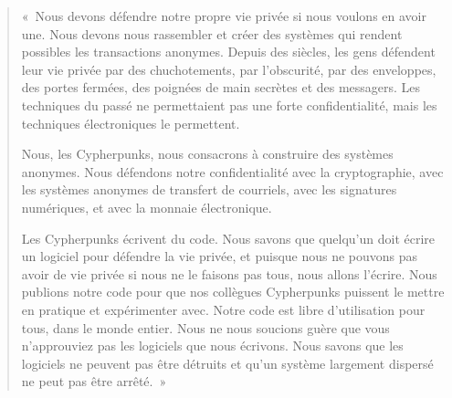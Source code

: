 \begin{quote}
«~Nous devons défendre notre propre vie privée si nous voulons en avoir une. Nous devons nous rassembler et créer des systèmes qui rendent possibles les transactions anonymes. Depuis des siècles, les gens défendent leur vie privée par des chuchotements, par l'obscurité, par des enveloppes, des portes fermées, des poignées de main secrètes et des messagers. Les techniques du passé ne permettaient pas une forte confidentialité, mais les techniques électroniques le permettent.

Nous, les Cypherpunks, nous consacrons à construire des systèmes anonymes. Nous défendons notre confidentialité avec la cryptographie, avec les systèmes anonymes de transfert de courriels, avec les signatures numériques, et avec la monnaie électronique.

Les Cypherpunks écrivent du code. Nous savons que quelqu'un doit écrire un logiciel pour défendre la vie privée, et puisque nous ne pouvons pas avoir de vie privée si nous ne le faisons pas tous, nous allons l'écrire. Nous publions notre code pour que nos collègues Cypherpunks puissent le mettre en pratique et expérimenter avec. Notre code est libre d'utilisation pour tous, dans le monde entier. Nous ne nous soucions guère que vous n'approuviez pas les logiciels que nous écrivons. Nous savons que les logiciels ne peuvent pas être détruits et qu'un système largement dispersé ne peut pas être arrêté.~»
\end{quote} %
%
%

